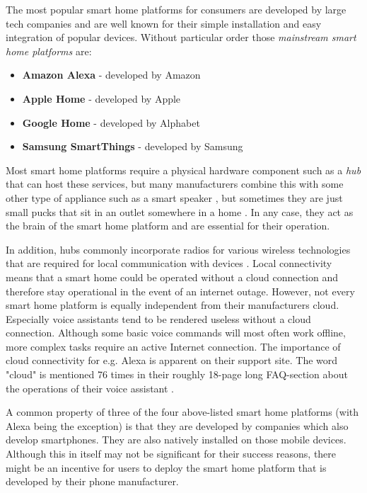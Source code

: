 The most popular smart home platforms for consumers are developed by large tech companies \cite{Tuohy2023SHP} and are well known for their simple installation and easy integration of popular devices. Without particular order those \textit{mainstream smart home platforms} are:
\begin{itemize}
    \item \textbf{Amazon Alexa} - developed by Amazon
    \item \textbf{Apple Home} - developed by Apple
    \item \textbf{Google Home} - developed by Alphabet
    \item \textbf{Samsung SmartThings} - developed by Samsung
\end{itemize}

Most smart home platforms require a physical hardware component such as a \textit{hub} \cite{BertkoChris2017HSH:} that can host these services, but many manufacturers combine this with some other type of appliance such as a smart speaker \cite{Tuohy2023SHP}, but sometimes they are just small pucks that sit in an outlet somewhere in a home \cite{Tuohy2023SHH}. In any case, they act as the brain of the smart home platform and are essential for their operation.

In addition, hubs commonly incorporate radios for various wireless technologies that are required for local communication with devices \cite{Tuohy2023SHH}. Local connectivity means that a smart home could be operated without a cloud connection and therefore stay operational in the event of an internet outage. However, not every smart home platform is equally independent from their manufacturers cloud. Especially voice assistants tend to be rendered useless without a cloud connection. Although some basic voice commands will most often work offline, more complex tasks require an active Internet connection. The importance of cloud connectivity for e.g. Alexa is apparent on their support site. The word "cloud" is mentioned 76 times in their roughly 18-page long FAQ-section about the operations of their voice assistant \cite{AmazonAlexaFAQ}.

A common property of three of the four above-listed smart home platforms (with Alexa being the exception) is that they are developed by companies which also develop smartphones. They are also natively installed on those mobile devices. Although this in itself may not be significant for their success reasons, there might be an incentive for users to deploy the smart home platform that is developed by their phone manufacturer.

